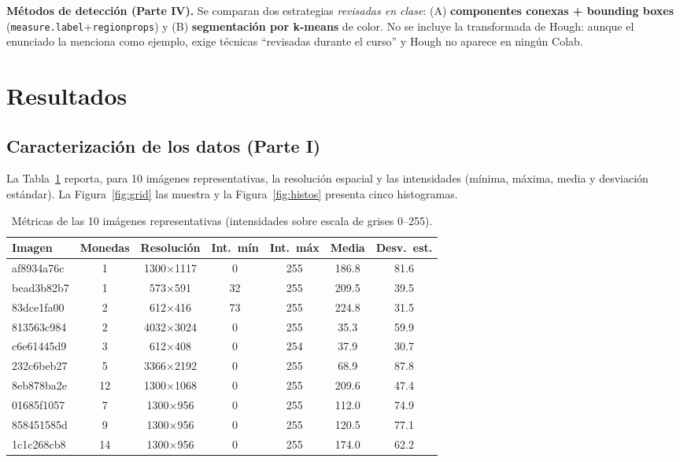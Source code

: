 \documentclass[11pt,a4paper]{article}
\newcommand{\code}[1]{\texttt{#1}}
\begin{document}
\textbf{Métodos de detección (Parte IV).} Se comparan dos estrategias \emph{revisadas en clase}: (A)
\textbf{componentes conexas + bounding boxes} (\code{measure.label}+\code{regionprops}) y (B)
\textbf{segmentación por k-means} de color. No se incluye la transformada de Hough: aunque el enunciado la
menciona como ejemplo, exige técnicas ``revisadas durante el curso'' y Hough no aparece en ningún Colab.

\section{Resultados}

\subsection{Caracterización de los datos (Parte I)}

La Tabla~\ref{tab:stats} reporta, para 10 imágenes representativas, la resolución espacial y las
intensidades (mínima, máxima, media y desviación estándar). La Figura~\ref{fig:grid} las muestra y la
Figura~\ref{fig:histos} presenta cinco histogramas.

\begin{table}[ht]
\centering
\small
\caption{Métricas de las 10 imágenes representativas (intensidades sobre escala de grises 0--255).}
\label{tab:stats}
\begin{tabular}{lcccccc}
\hline
Imagen & Monedas & Resolución & Int.\ mín & Int.\ máx & Media & Desv.\ est. \\
\hline
af8934a76c & 1  & 1300$\times$1117 & 0  & 255 & 186.8 & 81.6 \\
bead3b82b7 & 1  & 573$\times$591   & 32 & 255 & 209.5 & 39.5 \\
83dce1fa00 & 2  & 612$\times$416   & 73 & 255 & 224.8 & 31.5 \\
813563c984 & 2  & 4032$\times$3024 & 0  & 255 & 35.3  & 59.9 \\
c6e61445d9 & 3  & 612$\times$408   & 0  & 254 & 37.9  & 30.7 \\
232c6beb27 & 5  & 3366$\times$2192 & 0  & 255 & 68.9  & 87.8 \\
8eb878ba2e & 12 & 1300$\times$1068 & 0  & 255 & 209.6 & 47.4 \\
01685f1057 & 7  & 1300$\times$956  & 0  & 255 & 112.0 & 74.9 \\
858451585d & 9  & 1300$\times$956  & 0  & 255 & 120.5 & 77.1 \\
1c1c268cb8 & 14 & 1300$\times$956  & 0  & 255 & 174.0 & 62.2 \\
\hline
\end{tabular}
\end{table}
\end{document}
